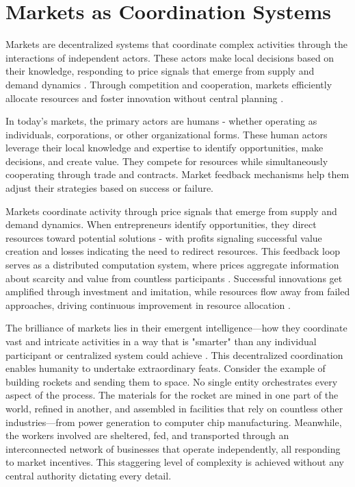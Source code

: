 \documentclass{article}
\begin{document}
\section{Markets as Coordination Systems}
Markets are decentralized systems that coordinate complex activities through the interactions of independent actors. These actors make local decisions based on their knowledge, responding to price signals that emerge from supply and demand dynamics \cite{hayek1945knowledge}. Through competition and cooperation, markets efficiently allocate resources and foster innovation without central planning \cite{smith1776wealth}.

In today's markets, the primary actors are humans - whether operating as individuals, corporations, or other organizational forms. These human actors leverage their local knowledge and expertise to identify opportunities, make decisions, and create value. They compete for resources while simultaneously cooperating through trade and contracts. Market feedback mechanisms help them adjust their strategies based on success or failure.

Markets coordinate activity through price signals that emerge from supply and demand dynamics. When entrepreneurs identify opportunities, they direct resources toward potential solutions - with profits signaling successful value creation and losses indicating the need to redirect resources. This feedback loop serves as a distributed computation system, where prices aggregate information about scarcity and value from countless participants \cite{hayek1945knowledge}. Successful innovations get amplified through investment and imitation, while resources flow away from failed approaches, driving continuous improvement in resource allocation \cite{schumpeter1942capitalism}.

The brilliance of markets lies in their emergent intelligence—how they coordinate vast and intricate activities in a way that is "smarter" than any individual participant or centralized system could achieve \cite{schelling1978micromotives}. This decentralized coordination enables humanity to undertake extraordinary feats. Consider the example of building rockets and sending them to space. No single entity orchestrates every aspect of the process. The materials for the rocket are mined in one part of the world, refined in another, and assembled in facilities that rely on countless other industries—from power generation to computer chip manufacturing. Meanwhile, the workers involved are sheltered, fed, and transported through an interconnected network of businesses that operate independently, all responding to market incentives. This staggering level of complexity is achieved without any central authority dictating every detail.
\end{document}
